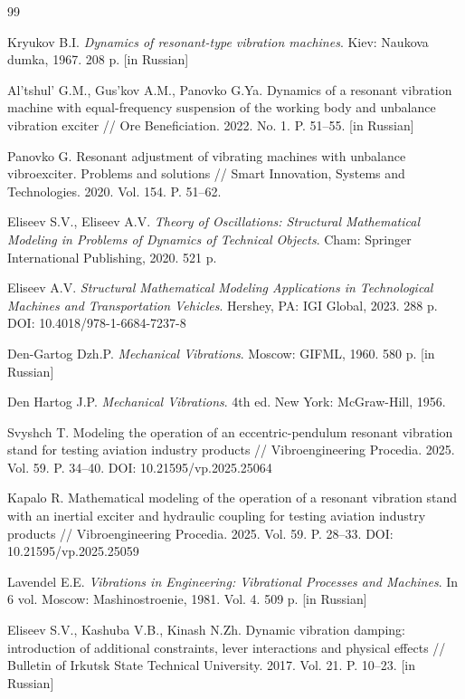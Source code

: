 \documentclass[12pt, a4paper]{article}
\begin{document}
	
	\begin{thebibliography}{99}
		
		Kryukov B.I.
		\textit{Dynamics of resonant-type vibration machines}.
		Kiev: Naukova dumka, 1967. 208 p. [in Russian]
		
		Al'tshul' G.M., Gus'kov A.M., Panovko G.Ya.
		Dynamics of a resonant vibration machine with equal-frequency suspension of the working body and unbalance vibration exciter
		// Ore Beneficiation. 2022. No. 1. P. 51--55. [in Russian]
		
		Panovko G.
		Resonant adjustment of vibrating machines with unbalance vibroexciter. Problems and solutions
		// Smart Innovation, Systems and Technologies. 2020. Vol. 154. P. 51--62.
		
		Eliseev S.V., Eliseev A.V.
		\textit{Theory of Oscillations: Structural Mathematical Modeling in Problems of Dynamics of Technical Objects}.
		Cham: Springer International Publishing, 2020. 521 p.
		
		Eliseev A.V.
		\textit{Structural Mathematical Modeling Applications in Technological Machines and Transportation Vehicles}.
		Hershey, PA: IGI Global, 2023. 288 p. DOI: 10.4018/978-1-6684-7237-8
		
		Den-Gartog Dzh.P.
		\textit{Mechanical Vibrations}.
		Moscow: GIFML, 1960. 580 p. [in Russian]
		
		Den Hartog J.P.
		\textit{Mechanical Vibrations}. 4th ed.
		New York: McGraw-Hill, 1956.
		
		Svyshch T.
		Modeling the operation of an eccentric-pendulum resonant vibration stand for testing aviation industry products
		// Vibroengineering Procedia. 2025. Vol. 59. P. 34--40. DOI: 10.21595/vp.2025.25064
		
		Kapalo R.
		Mathematical modeling of the operation of a resonant vibration stand with an inertial exciter and hydraulic coupling for testing aviation industry products
		// Vibroengineering Procedia. 2025. Vol. 59. P. 28--33. DOI: 10.21595/vp.2025.25059
		
		Lavendel E.E.
		\textit{Vibrations in Engineering: Vibrational Processes and Machines}. In 6 vol.
		Moscow: Mashinostroenie, 1981. Vol. 4. 509 p. [in Russian]
		
		Eliseev S.V., Kashuba V.B., Kinash N.Zh.
		Dynamic vibration damping: introduction of additional constraints, lever interactions and physical effects
		// Bulletin of Irkutsk State Technical University. 2017. Vol. 21. P. 10--23. [in Russian]
		

\end{thebibliography}
\end{document}
